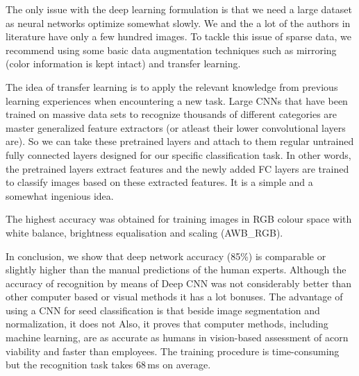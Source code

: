 \documentclass[letterpaper, 10 pt, conference]{ieeeconf}  %
\begin{document}
The only issue with the deep learning formulation is that we need a large dataset as neural networks optimize somewhat slowly. We and the a lot of the authors in literature have only a few hundred images. To tackle this issue of sparse data, we recommend using some basic data augmentation techniques such as mirroring (color information is kept intact) and transfer learning. 

The idea of transfer learning is to apply the relevant knowledge from previous learning experiences when encountering a new task. Large CNNs that have been trained on massive data sets to recognize thousands of different categories are master generalized feature extractors (or atleast their lower convolutional layers are). So we can take these pretrained layers and attach to them regular untrained fully connected layers designed for our specific classification task. In other words, the pretrained layers extract features and the newly added FC layers are trained to classify images based on these extracted features. It is a simple and a somewhat ingenious idea. 

 The highest accuracy was obtained for training images in RGB colour space with white balance, brightness equalisation and scaling (AWB\_RGB).

In conclusion, we show that deep network accuracy (85\%) is comparable or slightly higher than the manual predictions of the human experts. Although the accuracy of recognition by means of Deep CNN was not considerably better than other computer based or visual methods it has a lot bonuses. The advantage of using a CNN for seed classification is that beside image segmentation and normalization, it does not Also, it proves that computer methods, including machine learning, are as accurate as humans in vision-based assessment of acorn viability and faster than employees. The training procedure is time-consuming but the recognition task takes 68 ms on average.

\nocite{*}


\end{document}
